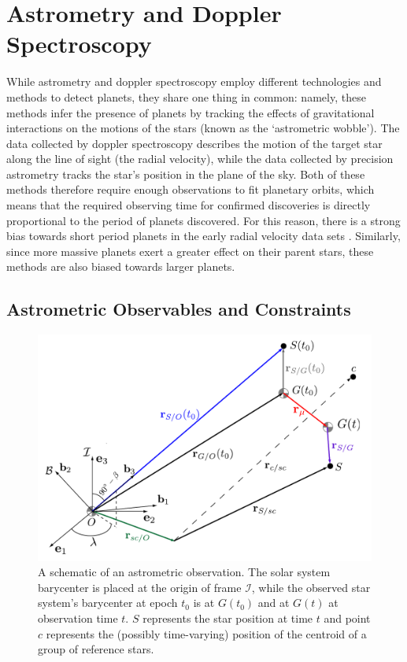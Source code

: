 \section{Astrometry and Doppler Spectroscopy}\label{sec:RV}
While astrometry and doppler spectroscopy employ different technologies and methods to detect planets, they share one thing in common:  namely, these methods infer the presence of planets by tracking the effects of gravitational interactions on the motions of the stars (known as the `astrometric wobble').  The data collected by doppler spectroscopy describes the motion of the target star along the line of sight (the radial velocity), while the data collected by precision astrometry tracks the star's position in the plane of the sky.  Both of these methods therefore require enough observations to fit planetary orbits, which means that the required observing time for confirmed discoveries is directly proportional to the period of planets discovered.  For this reason, there is a strong bias towards short period planets in the early radial velocity data sets \citep{butler2006,cumming2003,cumming2008}.  Similarly, since more massive planets exert a greater effect on their parent stars, these methods are also biased towards larger planets. 

\subsection{Astrometric Observables and Constraints}\label{sec:ast_inst_obs}
\begin{figure}[ht]
\centering
\includegraphics[width=6in]{./figures/ast_model}
 \caption[Astrometric observation schematic]{ A schematic of an astrometric observation.  The solar system barycenter is placed at the origin of frame $\mathcal{I}$, while the observed star system's barycenter at epoch $t_0$ is at $G(t_0)$ and at $G(t)$ at observation time $t$.  $S$ represents the star position at time $t$ and point $c$ represents the (possibly time-varying) position of the centroid of a group of reference stars.}
\label{fig:ast_model} 
\end{figure} 

